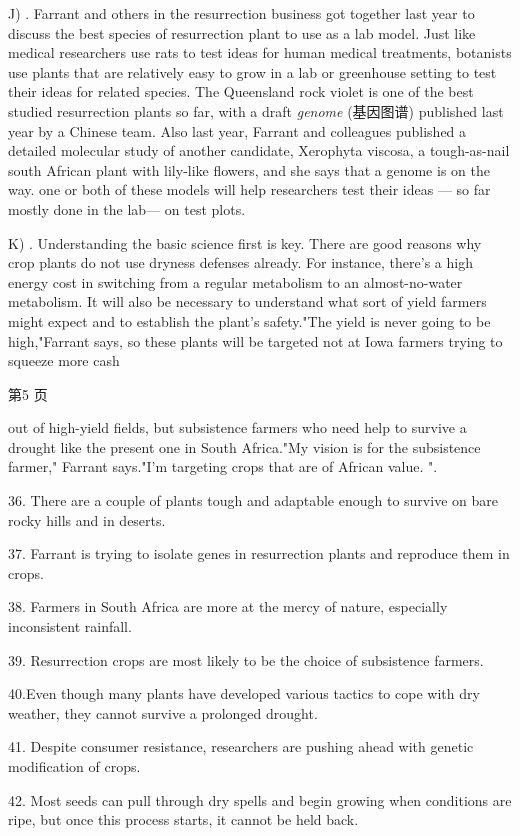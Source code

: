\documentclass[UTF8,11pt]{ctexart}
\begin{document}
J) . Farrant and others in the resurrection business got together last year to discuss the best species of resurrection plant to use as a lab model. Just like medical researchers use rats to test ideas for human medical treatments, botanists use plants that are relatively easy to grow in a lab or greenhouse setting to test their ideas for related species. The Queensland rock violet is one of the best studied resurrection plants so far, with a draft\textit{ genome} (基因图谱) published last year by a Chinese team. Also last year, Farrant and colleagues published a detailed molecular study of another candidate, Xerophyta viscosa, a tough-as-nail south African plant with lily-like flowers, and she says that a genome is on the way. one or both of these models will help researchers test their ideas — so far mostly done in the lab— on test plots.


K) . Understanding the basic science first is key. There are good reasons why crop plants do not use dryness defenses already. For instance, there's a high energy cost in switching from a regular metabolism to an almost-no-water metabolism. It will also be necessary to understand what sort of yield farmers might expect and to establish the plant's safety."The yield is never going to be high,"Farrant says, so these plants will be targeted not at Iowa farmers trying to squeeze more cash


第5 页


out of high-yield fields, but subsistence farmers who need help to survive a drought like the present one in South Africa."My vision is for the subsistence farmer," Farrant says."I'm targeting crops that are of African value. ".


36. There are a couple of plants tough and adaptable enough to survive on bare rocky hills and in deserts.


37. Farrant is trying to isolate genes in resurrection plants and reproduce them in crops.


38. Farmers in South Africa are more at the mercy of nature, especially inconsistent rainfall.


39. Resurrection crops are most likely to be the choice of subsistence farmers.


40.Even though many plants have developed various tactics to cope with dry weather, they cannot survive a prolonged drought.


41. Despite consumer resistance, researchers are pushing ahead with genetic modification of crops.


42. Most seeds can pull through dry spells and begin growing when conditions are ripe, but once this process starts, it cannot be held back.
\end{document}
